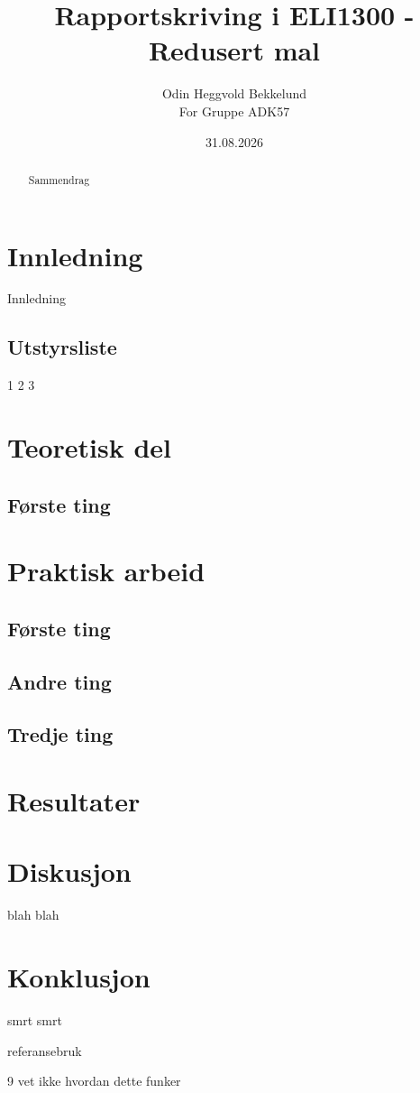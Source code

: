 \documentclass[11pt,a4paper,twocolumn]{article}
\title{Rapportskriving i ELI1300 - Redusert mal}
\author{Odin Heggvold Bekkelund\\For Gruppe ADK57}
\date{31.08.2026}
\begin{document}
\maketitle %

\begin{abstract}
Sammendrag
\end{abstract}


\section{Innledning}
Innledning

\subsection{Utstyrsliste}

1 2 3

\section{Teoretisk del}

\subsection{Første ting}

\section{Praktisk arbeid}

\subsection{Første ting}
\subsection{Andre ting}
\subsection{Tredje ting}

\section{Resultater}

\section{Diskusjon}

blah blah

\section{Konklusjon}

smrt smrt

referansebruk \cite{technical_name}

\begin{thebibliography}{9}
vet ikke hvordan dette funker
\end{thebibliography}
\end{document}
